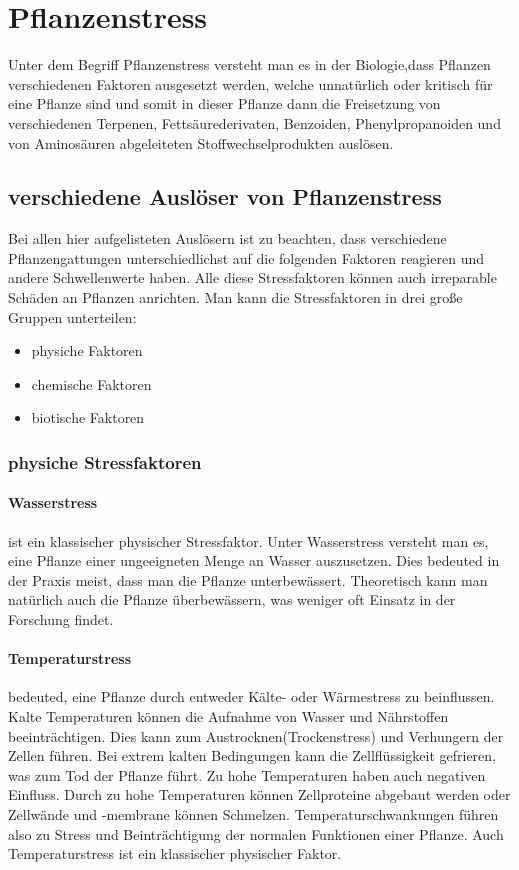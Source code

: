 \section{Pflanzenstress}
Unter dem Begriff Pflanzenstress versteht man es in der Biologie,dass Pflanzen verschiedenen Faktoren ausgesetzt werden, welche unnatürlich oder kritisch für eine Pflanze sind und somit in dieser Pflanze dann die Freisetzung von verschiedenen Terpenen, Fettsäurederivaten, Benzoiden, Phenylpropanoiden und von Aminosäuren abgeleiteten Stoffwechselprodukten auslösen. \cite{jk2010multiple}

\subsection{verschiedene Auslöser von Pflanzenstress}
Bei allen hier aufgelisteten Auslösern ist zu beachten, dass verschiedene Pflanzengattungen unterschiedlichst auf die folgenden Faktoren reagieren und andere Schwellenwerte haben. Alle diese Stressfaktoren können auch irreparable Schäden an Pflanzen anrichten.
Man kann die Stressfaktoren in drei große Gruppen unterteilen\cite{gaspar2002concepts}:
\begin{itemize}
  \item physiche Faktoren
  \item chemische Faktoren
  \item biotische Faktoren
\end{itemize}

\subsubsection{physiche Stressfaktoren}


\paragraph{Wasserstress} ist ein klassischer physischer Stressfaktor. Unter Wasserstress versteht man es, eine Pflanze einer ungeeigneten Menge an Wasser auszusetzen. Dies bedeuted in der Praxis meist, dass man die Pflanze unterbewässert. Theoretisch kann man natürlich auch die Pflanze überbewässern, was weniger oft Einsatz in der Forschung findet.

\paragraph{Temperaturstress} bedeuted, eine Pflanze durch entweder Kälte- oder Wärmestress zu beinflussen.
Kalte Temperaturen  können die Aufnahme von Wasser und Nährstoffen beeinträchtigen. Dies kann zum Austrocknen(Trockenstress) und Verhungern der Zellen führen. Bei extrem kalten Bedingungen kann die Zellflüssigkeit gefrieren, was zum Tod der Pflanze führt. Zu hohe Temperaturen haben auch negativen Einfluss. Durch zu hohe Temperaturen können Zellproteine abgebaut werden oder Zellwände und -membrane können Schmelzen. Temperaturschwankungen führen also zu Stress und Beinträchtigung der normalen Funktionen einer Pflanze. Auch Temperaturstress ist ein klassischer physischer Faktor.


